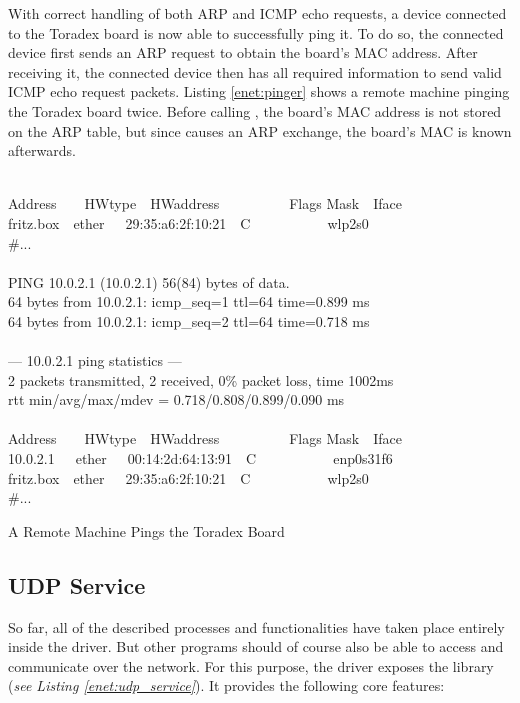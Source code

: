 With correct handling of both ARP and ICMP echo requests, a device connected to the Toradex board is now able to successfully ping it. To do so, the connected device first sends an ARP request to obtain the board's MAC address. After receiving it, the connected device then has all required information to send valid ICMP echo request packets. Listing \ref{enet:pinger} shows a remote machine pinging the Toradex board twice. Before calling , the board's MAC address is not stored on the ARP table, but since  causes an ARP exchange, the board's MAC is known afterwards.

\begin{code}
\begin{mdframed}[style=shell]
\\
Address\ \ \ \ HWtype\ \ HWaddress\ \ \ \ \ \ \ \ \ \ Flags Mask\ \ Iface\\
fritz.box\ \ ether\ \ \ 29:35:a6:2f:10:21\ \ C\ \ \ \ \ \ \ \ \ \ \ wlp2s0\\
\#...\\
\\
PING 10.0.2.1 (10.0.2.1) 56(84) bytes of data.\\
64 bytes from 10.0.2.1: icmp\_seq=1 ttl=64 time=0.899 ms\\
64 bytes from 10.0.2.1: icmp\_seq=2 ttl=64 time=0.718 ms\\
\\
--- 10.0.2.1 ping statistics ---\\
2 packets transmitted, 2 received, 0\% packet loss, time 1002ms\\
rtt min/avg/max/mdev = 0.718/0.808/0.899/0.090 ms\\
\\
Address\ \ \ \ HWtype\ \ HWaddress\ \ \ \ \ \ \ \ \ \ Flags Mask\ \ Iface\\
10.0.2.1\ \ \ ether\ \ \ 00:14:2d:64:13:91\ \ C\ \ \ \ \ \ \ \ \ \ \ enp0s31f6\\
fritz.box\ \ ether\ \ \ 29:35:a6:2f:10:21\ \ C\ \ \ \ \ \ \ \ \ \ \ wlp2s0\\
\#...
\end{mdframed}
\caption{A Remote Machine Pings the Toradex Board}
\end{code}
\label{enet:pinger}

\subsection{UDP Service}
So far, all of the described processes and functionalities have taken place entirely inside the driver. But other programs should of course also be able to access and communicate over the network. For this purpose, the driver exposes the library  (\emph{see Listing \ref{enet:udp_service}}). It provides the following core features:

